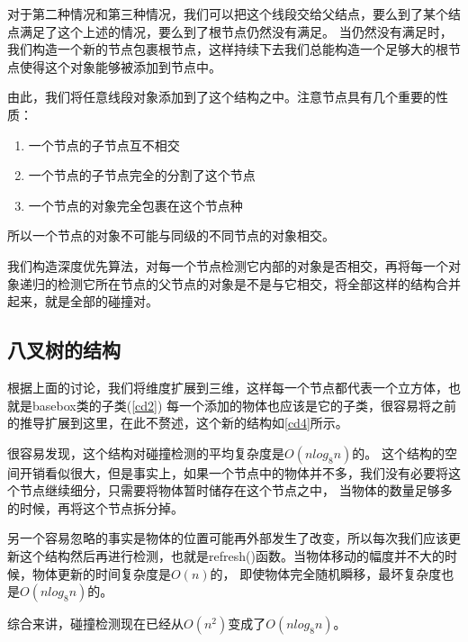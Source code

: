 对于第二种情况和第三种情况，我们可以把这个线段交给父结点，要么到了某个结点满足了这个上述的情况，要么到了根节点仍然没有满足。
当仍然没有满足时，我们构造一个新的节点包裹根节点，这样持续下去我们总能构造一个足够大的根节点使得这个对象能够被添加到节点中。

由此，我们将任意线段对象添加到了这个结构之中。注意节点具有几个重要的性质：
\begin{enumerate}
    \item 一个节点的子节点互不相交
    \item 一个节点的子节点完全的分割了这个节点
    \item 一个节点的对象完全包裹在这个节点种
\end{enumerate}
所以一个节点的对象不可能与同级的不同节点的对象相交。

我们构造深度优先算法，对每一个节点检测它内部的对象是否相交，再将每一个对象递归的检测它所在节点的父节点的对象是不是与它相交，将全部这样的结构合并起来，就是全部的碰撞对。

\subsection{八叉树的结构}
根据上面的讨论，我们将维度扩展到三维，这样每一个节点都代表一个立方体，也就是basebox类的子类(\ref{cd2})
每一个添加的物体也应该是它的子类，很容易将之前的推导扩展到这里，在此不赘述，这个新的结构如\ref{cd4}所示。

很容易发现，这个结构对碰撞检测的平均复杂度是$O(n log_8n) $的。
这个结构的空间开销看似很大，但是事实上，如果一个节点中的物体并不多，我们没有必要将这个节点继续细分，只需要将物体暂时储存在这个节点之中，
当物体的数量足够多的时候，再将这个节点拆分掉。

另一个容易忽略的事实是物体的位置可能再外部发生了改变，所以每次我们应该更新这个结构然后再进行检测，也就是refresh()函数。当物体移动的幅度并不大的时候，物体更新的时间复杂度是$O(n)$的，
即使物体完全随机瞬移，最坏复杂度也是$O(n log_8n) $的。

综合来讲，碰撞检测现在已经从$O(n^2) $变成了$O(n log_8n) $。

